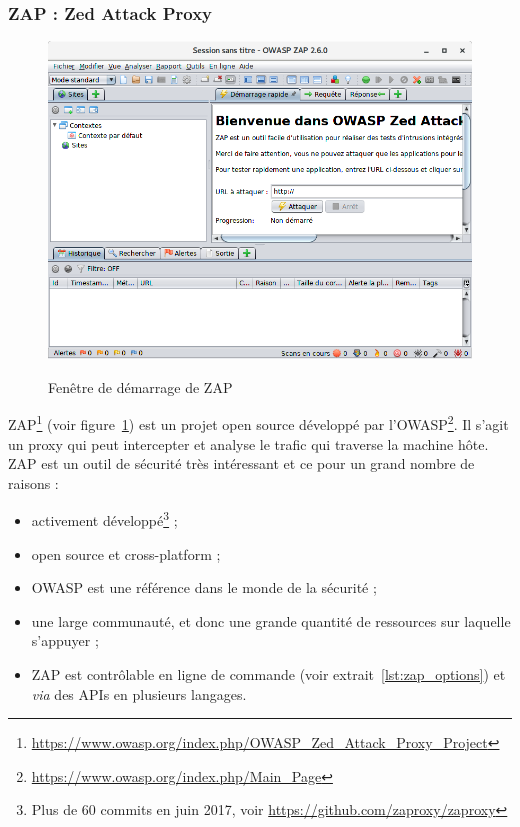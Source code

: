 \subsubsection{ZAP : Zed Attack Proxy}
\begin{figure}
	{\includegraphics[width=\textwidth]{images/zap_acceuil}}
	\centering
	\caption{Fenêtre de démarrage de ZAP}
	\label{fig:zap_acceuil}
\end{figure}
ZAP\footnote{\url{https://www.owasp.org/index.php/OWASP_Zed_Attack_Proxy_Project}} (voir figure~\ref{fig:zap_acceuil}) est un projet open source développé par l'OWASP\footnote{\url{https://www.owasp.org/index.php/Main_Page}}. Il s'agit un proxy qui peut intercepter et analyse le trafic qui traverse la machine hôte. ZAP est un outil de sécurité très intéressant et ce pour un grand nombre de raisons :
\begin{itemize}[label=$\bullet$]
	\item activement développé\footnote{Plus de 60 commits en juin 2017, voir \url{https://github.com/zaproxy/zaproxy}} ;
	\item open source et cross-platform ;
	\item OWASP est une référence dans le monde de la sécurité ;
	\item une large communauté, et donc une grande quantité de ressources sur laquelle s'appuyer ;
	\item ZAP est contrôlable en ligne de commande (voir extrait~\ref{lst:zap_options}) et \textit{via} des APIs en plusieurs langages.
\end{itemize}

